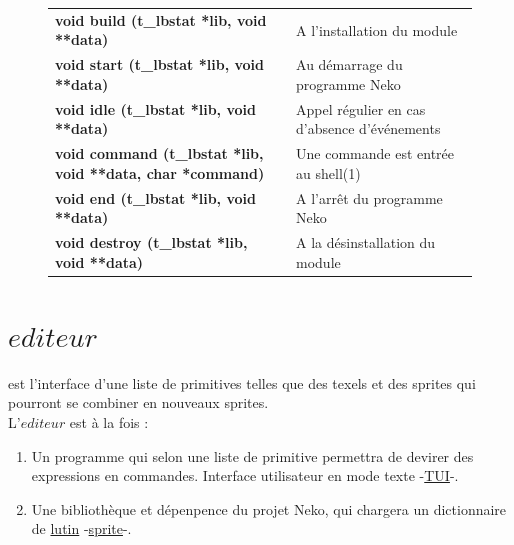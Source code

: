 \documentclass{report}
\newcommand{\dependency}{\textit{editeur}}
\begin{document}
\begin{figure}[!ht]
    \begin{minipage}{\textwidth}
    \centering
        \begin{tabular}{p{}p{}}
            \textbf{void build (t\_lbstat *lib, void **data)} & A l'installation du module \\
            \textbf{void start (t\_lbstat *lib, void **data)} & Au démarrage du programme Neko \\
            \textbf{void idle (t\_lbstat *lib, void **data)} & Appel régulier en cas d'absence d'événements \\
            \textbf{void command (t\_lbstat *lib, void **data, char *command)} & Une commande est entrée au shell(1) \\
            \textbf{void end (t\_lbstat *lib, void **data)} & A l'arrêt du programme Neko \\
            \textbf{void destroy (t\_lbstat *lib, void **data)} & A la désinstallation du module \\
        \end{tabular}
    \end{minipage}
\end{figure}

\section{$\dependency$}

 est l'interface d'une liste de primitives telles que des texels et des sprites qui pourront se combiner en nouveaux sprites. \\

L'$\dependency$ est à la fois : \\

\begin{enumerate}
	\item Un programme qui selon une liste de primitive permettra de devirer des expressions en commandes.
	Interface utilisateur en mode texte -\href{https://en.wikipedia.org/wiki/Text-based_user_interface}{TUI}-.
	\item Une bibliothèque et dépenpence du projet Neko, qui chargera un dictionnaire de \href{https://fr.wikipedia.org/wiki/Sprite_(jeu_vid%C3%A9o)}{lutin} -\href{https://en.wikipedia.org/wiki/Sprite_(computer_graphics)}{sprite}-.
\end{enumerate}
\end{document}
